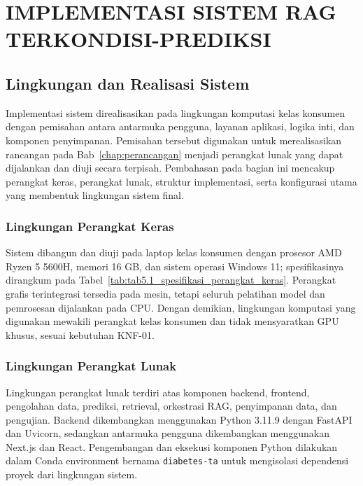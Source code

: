 \cleardoublepage
\chapter{IMPLEMENTASI SISTEM RAG TERKONDISI-PREDIKSI}
\label{chap:implementasi}

\section{Lingkungan dan Realisasi Sistem}
\label{sec:bab5-lingkungan-realisasi-sistem}

Implementasi sistem direalisasikan pada lingkungan komputasi kelas konsumen dengan pemisahan antara antarmuka pengguna, layanan aplikasi, logika inti, dan komponen
penyimpanan. Pemisahan tersebut digunakan untuk merealisasikan rancangan pada Bab~\ref{chap:perancangan} menjadi perangkat lunak yang dapat dijalankan dan diuji secara terpisah.
Pembahasan pada bagian ini mencakup perangkat keras, perangkat lunak, struktur implementasi, serta konfigurasi utama yang membentuk lingkungan sistem final.

\subsection{Lingkungan Perangkat Keras}
\label{subsec:bab5-lingkungan-perangkat-keras}

Sistem dibangun dan diuji pada laptop kelas konsumen dengan prosesor AMD Ryzen 5 5600H, memori 16 GB, dan sistem operasi Windows 11; spesifikasinya dirangkum pada
Tabel~\ref{tab:tab5.1_spesifikasi_perangkat_keras}. Perangkat grafis terintegrasi tersedia pada mesin, tetapi seluruh pelatihan model dan pemrosesan dijalankan pada
CPU. Dengan demikian, lingkungan komputasi yang digunakan mewakili perangkat kelas konsumen dan tidak mensyaratkan GPU khusus, sesuai kebutuhan KNF-01.



\subsection{Lingkungan Perangkat Lunak}
\label{subsec:bab5-lingkungan-perangkat-lunak}

Lingkungan perangkat lunak terdiri atas komponen backend, frontend, pengolahan data, prediksi, retrieval, orkestrasi RAG, penyimpanan data, dan pengujian. Backend
dikembangkan menggunakan Python 3.11.9 dengan FastAPI dan Uvicorn, sedangkan antarmuka pengguna dikembangkan menggunakan Next.js dan React. Pengembangan dan eksekusi
komponen Python dilakukan dalam Conda environment bernama \texttt{diabetes-ta} untuk mengisolasi dependensi proyek dari lingkungan sistem.

